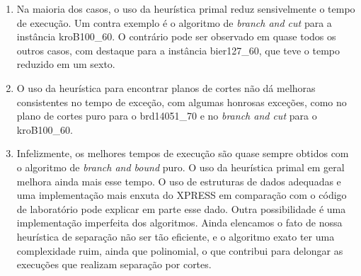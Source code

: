 \documentclass[11pt]{article}
\begin{document}
\begin{enumerate}
 \item Na maioria dos casos, o uso da heurística primal reduz
       sensivelmente o tempo de execução. Um contra exemplo é o
       algoritmo de \emph{branch and cut} para a instância
       kroB100\_60. O contrário pode ser observado em quase todos os
       outros casos, com destaque para a instância bier127\_60, que teve
       o tempo reduzido em um sexto. 
 \item O uso da heurística para encontrar planos de cortes não dá
       melhoras consistentes no tempo de exceção, com algumas honrosas
       exceções, como no plano de cortes puro para o brd14051\_70 e no
       \emph{branch and cut} para o kroB100\_60.
 \item Infelizmente, os melhores tempos de execução são quase sempre
       obtidos com o algoritmo de \emph{branch and bound} puro. O uso da
       heurística primal em geral melhora ainda mais esse tempo. O uso
       de estruturas de dados adequadas e uma implementação mais enxuta
       do XPRESS em comparação com o código de laboratório pode explicar
       em parte esse dado. Outra possibilidade é uma implementação
       imperfeita dos algoritmos. Ainda elencamos o fato de nossa
       heurística de separação não ser tão eficiente, e o algoritmo
       exato ter uma complexidade ruim, ainda que polinomial, o que
       contribui para delongar as execuções que realizam separação por
       cortes. 
\end{enumerate} 



\end{document}
